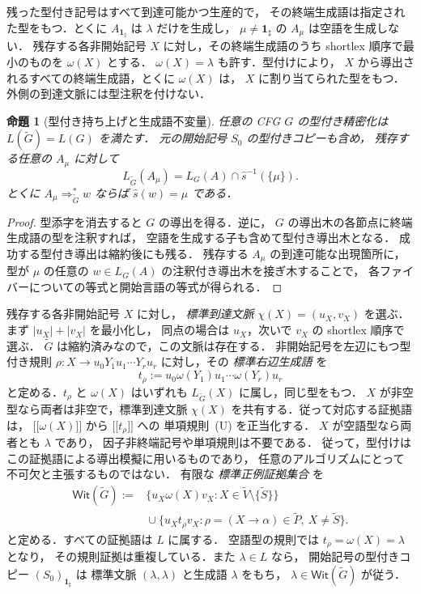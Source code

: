 \documentclass[11pt,a4paper]{ltjsarticle}
\newcommand{\NT}[1]{\mathopen{[\![}#1\mathclose{]\!]}}
\newtheorem{proposition}[theorem]{命題}
\theoremstyle{remark}
\theoremstyle{plain}
\newcommand{\WitnessSet}{\mathsf{Wit}}
\begin{document}
残った型付き記号はすべて到達可能かつ生産的で，
その終端生成語は指定された型をもつ．とくに
$A_{\mathbf{1}_{\sharp}}$ は $\lambda$ だけを生成し，
$\mu\ne\mathbf{1}_{\sharp}$ の $A_\mu$ は空語を生成しない．
残存する各非開始記号 $X$ に対し，その終端生成語のうち
shortlex 順序で最小のものを $\omega(X)$ とする．
$\omega(X)=\lambda$ も許す．型付けにより，
$X$ から導出されるすべての終端生成語，とくに $\omega(X)$ は，
$X$ に割り当てられた型をもつ．
外側の到達文脈には型注釈を付けない．

\begin{proposition}[型付き持ち上げと生成語不変量]\label{prop:typed-core}
任意の CFG $G$ の型付き精密化は
$L(\widetilde G)=L(G)$ を満たす．
元の開始記号 $S_0$ の型付きコピーも含め，
残存する任意の $A_\mu$ に対して
\[
 L_{\widetilde G}(A_\mu)
 =L_G(A)\cap\widehat s^{-1}(\{\mu\}).
\]
とくに $A_\mu\Rightarrow_{\widetilde G}^*w$ ならば
$\widehat s(w)=\mu$ である．
\end{proposition}
\begin{proof}
型添字を消去すると $G$ の導出を得る．逆に，
$G$ の導出木の各節点に終端生成語の型を注釈すれば，
空語を生成する子も含めて型付き導出木となる．
成功する型付き導出は縮約後にも残る．
残存する $A_\mu$ の到達可能な出現箇所に，
型が $\mu$ の任意の
$w\in L_G(A)$ の注釈付き導出木を接ぎ木することで，
各ファイバーについての等式と開始言語の等式が得られる．
\end{proof}

残存する各非開始記号 $X$ に対し，
\emph{標準到達文脈}
$\chi(X)=(u_X,v_X)$ を選ぶ．
まず $|u_X|+|v_X|$ を最小化し，
同点の場合は $u_X$，次いで $v_X$ の shortlex 順序で選ぶ．
$\widetilde G$ は縮約済みなので，この文脈は存在する．
非開始記号を左辺にもつ型付き規則
$\rho:X\to u_0Y_1u_1\cdots Y_ru_r$
に対し，その \emph{標準右辺生成語} を
\[
 t_\rho:=u_0\omega(Y_1)u_1\cdots\omega(Y_r)u_r
\]
と定める．$t_\rho$ と $\omega(X)$ はいずれも
$L_{\widetilde G}(X)$ に属し，同じ型をもつ．
$X$ が非空型なら両者は非空で，標準到達文脈
$\chi(X)$ を共有する．従って対応する証拠語は，
$\NT{\omega(X)}$ から $\NT{t_\rho}$ への
単項規則~\textup{(U)} を正当化する．
$X$ が空語型なら両者とも $\lambda$ であり，
因子非終端記号や単項規則は不要である．
従って，型付けはこの証拠語による導出模擬に用いるものであり，
任意のアルゴリズムにとって不可欠と主張するものではない．
有限な \emph{標準正例証拠集合} を
\begin{equation}\label{eq:W}
\begin{split}
\WitnessSet(\widetilde G):={}&
 \{u_X\omega(X)v_X:
 X\in\widetilde V\setminus\{\widetilde S\}\}\\
 &{}\cup\{u_Xt_\rho v_X:
 \rho=(X\to\alpha)\in\widetilde P,\
 X\ne\widetilde S\}.
\end{split}
\end{equation}
と定める．すべての証拠語は $L$ に属する．
空語型の規則では $t_\rho=\omega(X)=\lambda$ となり，
その規則証拠は重複している．また $\lambda\in L$ なら，
開始記号の型付きコピー $(S_0)_{\mathbf{1}_{\sharp}}$ は
標準文脈 $(\lambda,\lambda)$ と生成語 $\lambda$ をもち，
$\lambda\in\WitnessSet(\widetilde G)$ が従う．
\end{document}
